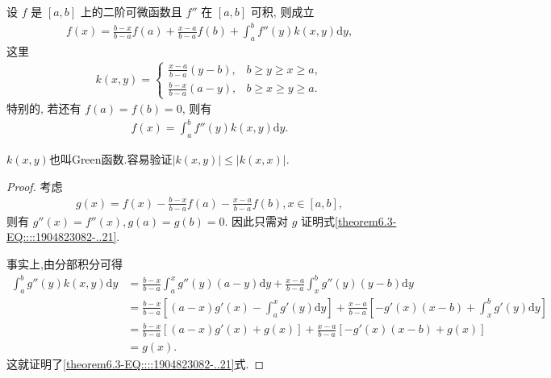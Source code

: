 \documentclass[../../main.tex]{subfiles}
\begin{document}
\begin{theorem}[带积分型余项的Lagrange插值公式]\label{theorem:带积分型余项的Lagrange插值公式}
设 $f$ 是 $[a,b]$ 上的二阶可微函数且 $f''$ 在 $[a,b]$ 可积, 则成立
\begin{align*}
f(x) = \frac{b-x}{b-a} f(a) + \frac{x-a}{b-a} f(b) + \int_{a}^{b} f''(y) k(x,y) \mathrm{d}y,
\end{align*}
这里
\begin{align*}
k(x,y) = 
\begin{cases}
\frac{x-a}{b-a} (y-b), & b \geqslant  y \geqslant  x \geqslant  a, \\
\frac{b-x}{b-a} (a-y), & b \geqslant  x \geqslant  y \geqslant  a.
\end{cases}
\end{align*}
特别的, 若还有 $f(a) = f(b) = 0$, 则有
\begin{align}
f(x) = \int_{a}^{b} f''(y) k(x,y) \mathrm{d}y.\label{theorem6.3-EQ::::1904823082-..21}
\end{align}
\end{theorem}
\begin{note}
$k(x,y)$也叫Green函数.容易验证$|k(x,y)|\leqslant  |k(x,x)|$.
\end{note}
\begin{proof}
考虑
\begin{align*}
g(x) = f(x) - \frac{b-x}{b-a} f(a) - \frac{x-a}{b-a} f(b), x \in [a,b],
\end{align*}
则有 $g''(x) = f''(x), g(a) = g(b) = 0$. 因此只需对 $g$ 证明式\eqref{theorem6.3-EQ::::1904823082-..21}.

事实上,由分部积分可得
\begin{align*}
\int_{a}^{b} g''(y) k(x,y) \mathrm{d}y &= \frac{b-x}{b-a} \int_{a}^{x} g''(y) (a-y) \mathrm{d}y + \frac{x-a}{b-a} \int_{x}^{b} g''(y) (y-b) \mathrm{d}y \\
&= \frac{b-x}{b-a} \left[ (a-x) g'(x) - \int_{a}^{x} g'(y) \mathrm{d}y \right] + \frac{x-a}{b-a} \left[ -g'(x) (x-b) + \int_{x}^{b} g'(y) \mathrm{d}y \right] \\
&= \frac{b-x}{b-a} [(a-x) g'(x) + g(x)] + \frac{x-a}{b-a} [-g'(x) (x-b) + g(x)] \\
&= g(x).
\end{align*}
这就证明了\eqref{theorem6.3-EQ::::1904823082-..21}式.
\end{proof}
\end{document}
